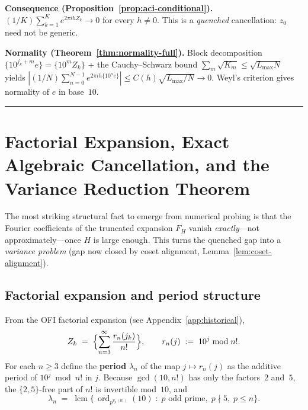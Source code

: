 \documentclass[
]{article}
\begin{document}
\medskip\noindent\textbf{Consequence (Proposition~\ref{prop:aci-conditional}).}
$(1/K)\sum_{k=1}^K e^{2\pi ih Z_k}\to 0$ for every $h\ne 0$.
This is a \emph{quenched} cancellation: $z_0$ need not be generic.

\medskip\noindent\textbf{Normality (Theorem~\ref{thm:normality-full}).}
Block decomposition $\{10^{j_k+m}e\} = \{10^m Z_k\}$ + the Cauchy--Schwarz
bound $\sum_m\sqrt{K_m}\le\sqrt{L_{\max}N}$ yields
$|(1/N)\sum_{n=0}^{N-1}e^{2\pi ih\{10^n e\}}|\le C(h)\sqrt{L_{\max}/N}\to 0$.
Weyl's criterion gives normality of $e$ in base~$10$.

\begin{center}\rule{0.5\linewidth}{0.5pt}\end{center}


\section{Factorial Expansion, Exact Algebraic Cancellation, and the
         Variance Reduction Theorem}
\label{sec:factorial-cancellation}

The most striking structural fact to emerge from numerical probing is
that the Fourier coefficients of the truncated expansion $F_H$ vanish
\emph{exactly}---not approximately---once $H$ is large enough.  This
turns the quenched gap into a \emph{variance problem} (gap now closed by coset alignment, Lemma~\ref{lem:coset-alignment}).

\subsection{Factorial expansion and period structure}
\label{sec:factorial-period}

From the OFI factorial expansion (see Appendix~\ref{app:historical}),
\begin{equation}\label{eq:fac-expand}
  Z_k \;=\; \Bigl\{\sum_{n=3}^{\infty} \frac{r_n(j_k)}{n!}\Bigr\},
  \qquad r_n(j) \;:=\; 10^j \bmod n!.
\end{equation}
For each $n\ge 3$ define the \textbf{period} $\lambda_n$ of the map
$j\mapsto r_n(j)$ as the additive period of $10^j\bmod n!$ in $j$.
Because $\gcd(10,n!)$ has only the factors~$2$ and~$5$, the
$\{2,5\}$-free part of $n!$ is invertible mod~$10$, and
\[
  \lambda_n \;=\; \operatorname{lcm}\bigl\{\,
    \operatorname{ord}_{p^{v_p(n!)}}(10) \;:\;
    p \text{ odd prime},\; p\nmid 5,\; p\le n \bigr\}.
\]
\end{document}
